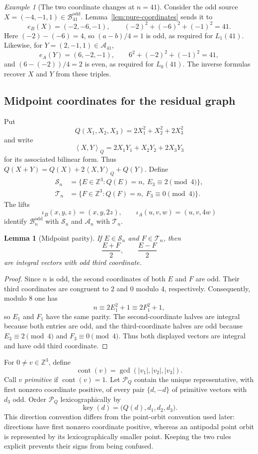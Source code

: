 \documentclass[11pt]{amsart}
\newtheorem{lemma}[theorem]{Lemma}
\theoremstyle{definition}
\theoremstyle{remark}
\newtheorem{example}[theorem]{Example}
\newcommand{\Z}{\mathbb Z}
\newcommand{\An}{\mathcal A_n}
\newcommand{\Bodd}{\mathcal B_n^{\mathrm{odd}}}
\newcommand{\Sn}{\mathcal S_n}
\newcommand{\Tn}{\mathcal T_n}
\newcommand{\Dcal}{\mathcal P_Q}
\newcommand{\key}{\operatorname{key}}
\newcommand{\cont}{\operatorname{cont}}
\newcommand{\Qip}[2]{\left\langle #1,#2\right\rangle_Q}
\begin{document}
\begin{example}[The two coordinate changes at $n=41$]
\label{ex:coordinates-41}
Consider the odd source $X=(-4,-1,1)\in\mathcal B_{41}^{\mathrm{odd}}$.
Lemma~\ref{lem:pure-coordinates} sends it to
\[
 e_B(X)=(-2,-6,-1),
 \qquad
 (-2)^2+(-6)^2+(-1)^2=41.
\]
Here $(-2)-(-6)=4$, so $(a-b)/4=1$ is odd, as required for $L_1(41)$.
Likewise, for $Y=(2,-1,1)\in\mathcal A_{41}$,
\[
 e_A(Y)=(6,-2,-1),
 \qquad
 6^2+(-2)^2+(-1)^2=41,
\]
and $(6-(-2))/4=2$ is even, as required for $L_0(41)$.  The inverse formulas
recover $X$ and $Y$ from these triples.
\end{example}

\subsection{Midpoint coordinates for the residual graph}
Put
\[
 Q(X_1,X_2,X_3)=2X_1^2+X_2^2+2X_3^2
\]
and write
\[
 \Qip{X}{Y}=2X_1Y_1+X_2Y_2+2X_3Y_3
\]
for its associated bilinear form.  Thus
$Q(X+Y)=Q(X)+2\Qip{X}{Y}+Q(Y)$.  Define
\begin{align*}
 \Sn&=\{E\in\Z^3:Q(E)=n,\ E_3\equiv2\pmod4\},\\
 \Tn&=\{F\in\Z^3:Q(F)=n,\ F_3\equiv0\pmod4\}.
\end{align*}
The lifts
\[
 \iota_B(x,y,z)=(x,y,2z),
 \qquad
 \iota_A(u,v,w)=(u,v,4w)
\]
identify $\Bodd$ with $\Sn$ and $\An$ with $\Tn$.

\begin{lemma}[Midpoint parity]\label{lem:midpoint-parity}
If $E\in\Sn$ and $F\in\Tn$, then
\[
 \frac{E+F}{2},\qquad \frac{E-F}{2}
\]
are integral vectors with odd third coordinate.
\end{lemma}

\begin{proof}
Since $n$ is odd, the second coordinates of both $E$ and $F$ are odd.  Their
third coordinates are congruent to $2$ and $0$ modulo $4$, respectively.
Consequently, modulo $8$ one has
\[
 n\equiv2E_1^2+1\equiv2F_1^2+1,
\]
so $E_1$ and $F_1$ have the same parity.  The second-coordinate halves are
integral because both entries are odd, and the third-coordinate halves are
odd because $E_3\equiv2\pmod4$ and $F_3\equiv0\pmod4$.  Thus both displayed
vectors are integral and have odd third coordinate.
\end{proof}

For $0\ne v\in\Z^3$, define
\[
 \cont(v)=\gcd(|v_1|,|v_2|,|v_3|).
\]
Call $v$ \emph{primitive} if $\cont(v)=1$.  Let $\Dcal$ contain the unique
representative, with first nonzero coordinate positive, of every pair
$\{d,-d\}$ of primitive vectors with $d_3$ odd.  Order $\Dcal$
lexicographically by
\begin{equation}\label{eq:direction-key}
 \key(d)=\bigl(Q(d),d_1,d_2,d_3\bigr).
\end{equation}
This direction convention differs from the point-orbit convention used later:
directions have first nonzero coordinate positive, whereas an antipodal point
orbit is represented by its lexicographically smaller point.  Keeping the two
rules explicit prevents their signs from being confused.
\end{document}
